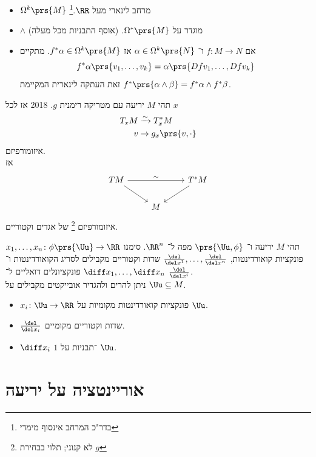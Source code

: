 \documentclass[a4paper,10pt,twoside,openany]{book}
\begin{document}
\begin{proposition}
\begin{itemize}
\item $\Omega^k\prs{M}$
מרחב לינארי מעל
$\RR$.\footnote{בדר"כ המרחב אינסוף מימדי}
\item $\wedge$
מוגדר על
$\Omega^*\prs{M}$. (אוסף התבניות מכל מעלה)
\item 
אם
$f \colon M \to N$
ו־%
$\alpha \in \Omega^k \prs{N}$
אז
$f^* \alpha \in \Omega^k\prs{M}$.
מתקיים
\[f^* \alpha \prs{v_1,\ldots, v_k} = \alpha \prs{Df v_1, \ldots, Df v_k}\]
זאת העתקה לינארית המקיימת
$f^*\prs{\alpha \wedge \beta} = f^* \alpha \wedge f^* \beta$.
\end{itemize}
\end{proposition}

תהי
$M$
יריעה עם מטריקה רימנית
$g$.%
%
{2018}%
אז לכל $x$
\begin{align*}
T_x M &\xrightarrow{\sim} T_x^* M \\
v &\to g_x\prs{v,\cdot}
\end{align*}
איזומורפיזם.
\\
אז
\[\begin{tikzcd}
TM \arrow[rr,"\sim"] \arrow[dr] && T^*M \arrow[dl]\\
& M &
\end{tikzcd}
\]
איזומורפיזם%
\footnote{לא קנוני; תלוי בבחירת $g$}
של אגדים וקטוריים.

\begin{notation}
תהי
$M$
יריעה ו־%
$\prs{\Uu,\phi}$
מפה ל־%
$\RR^n$.
סימנו
$x_1, \ldots, x_n \colon \phi\prs{\Uu} \to \RR$
פונקציות קואורדינטות,
$\frac{\del}{\del x^1}, \ldots, \frac{\del}{\del x^n}$
שדות וקטוריים מקבילים לסריג הקואורדינטות ו־%
$\diff x_1, \ldots, \diff x_n$
פונקציונלים דואליים ל־%
$\frac{\del}{\del x^i}$.\\
ניתן להרים ולהגדיר אובייקטים מקבילים על
$\Uu \subseteq M$.
\begin{itemize}
\item $x_i \colon \Uu \to \RR$
פונקציות קואורדינטות מקומיות על
$\Uu$.
\item $\frac{\del}{\del x_i}$
שדות וקטוריים מקומיים.
\item $\diff x_i$
$1$%
־תבניות על
$\Uu$.
\end{itemize}
\end{notation}

\section{אוריינטציה על יריעה}
\end{document}
